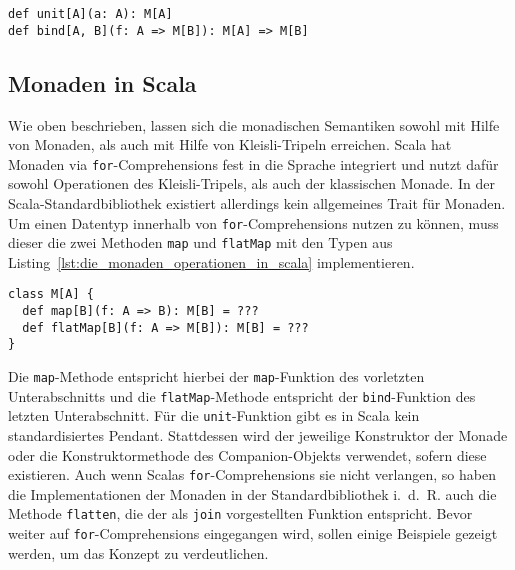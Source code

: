\begin{lstlisting}[caption=Die Kleisli-Tripel-Operationen der Kategorientheorie, label=lst:die_kleisli_tripel_operationen_der_kategorientheorie]
def unit[A](a: A): M[A]
def bind[A, B](f: A => M[B]): M[A] => M[B]
\end{lstlisting}


\subsection{Monaden in Scala} %
\label{sub:monaden_in_der_programmierung}

Wie oben beschrieben, lassen sich die monadischen Semantiken sowohl mit Hilfe von Monaden, als auch mit Hilfe von Kleisli-Tripeln erreichen.
Scala hat Monaden via \lstinline|for|-Comprehensions fest in die Sprache integriert und nutzt dafür sowohl Operationen des Kleisli-Tripels, als auch der klassischen Monade.
In der Scala-Standardbibliothek existiert allerdings kein allgemeines Trait für Monaden.
Um einen Datentyp innerhalb von \lstinline|for|-Comprehensions nutzen zu können, muss dieser die zwei Methoden \lstinline|map| und \lstinline|flatMap| mit den Typen aus Listing~\ref{lst:die_monaden_operationen_in_scala} implementieren.

\begin{lstlisting}[caption=Die Monaden-Operationen in Scala, label=lst:die_monaden_operationen_in_scala]
class M[A] {
  def map[B](f: A => B): M[B] = ???
  def flatMap[B](f: A => M[B]): M[B] = ???
}
\end{lstlisting}

Die \lstinline|map|-Methode entspricht hierbei der \lstinline|map|-Funktion des vorletzten Unterabschnitts und die \lstinline|flatMap|-Methode entspricht der \lstinline|bind|-Funktion des letzten Unterabschnitt.
Für die \lstinline|unit|-Funktion gibt es in Scala kein standardisiertes Pendant.
Stattdessen wird der jeweilige Konstruktor der Monade oder die Konstruktormethode des Companion-Objekts verwendet, sofern diese existieren.
Auch wenn Scalas \lstinline|for|-Comprehensions sie nicht verlangen, so haben die Implementationen der Monaden in der Standardbibliothek i.~d.~R. auch die Methode \lstinline|flatten|, die der als \lstinline|join| vorgestellten Funktion entspricht.
Bevor weiter auf \lstinline|for|-Comprehensions eingegangen wird, sollen einige Beispiele gezeigt werden, um das Konzept zu verdeutlichen.

